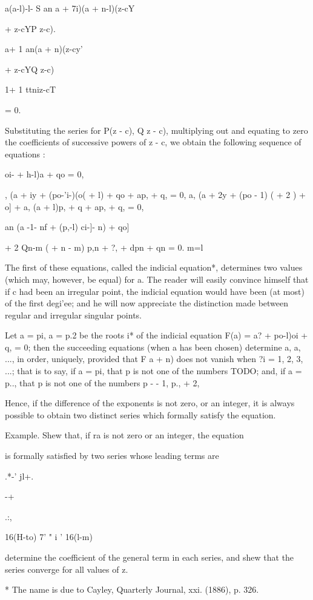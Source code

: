a(a-l)-l- S an a + 7i)(a + n-l)(z-cY

+ z-cYP z-c).

a+ 1 an(a + n)(z-cy'

+ z-cYQ z-c)

1+ 1 ttniz-cT

= 0.

Substituting the series for P(z - c), Q z - c), multiplying out and
equating to zero the coefficients of successive powers of z - c, we
obtain the following sequence of equations :

oi- + h-l)a + qo = 0,

, (a + iy + (po-'i-)(o( + l) + qo + ap, + q, = 0, a, (a + 2y + (po -
1) ( + 2 ) + o] + a, (a + l)p, + q + ap, + q, = 0,

an (a -1- nf + (p,-l) ci-]- n) + qo]

+ 2 Qn-m ( + n - m) p,n + ?, + dpn + qn = 0. m=l

The first of these equations, called the indicial equation*,
determines two values (which may, however, be equal) for a. The reader
will easily convince himself that if c had been an irregular point,
the indicial equation would have been (at most) of the first degi'ee;
and he will now appreciate the distinction made between regular and
irregular singular points.

Let a = pi, a = p.2 be the roots i* of the indicial equation F(a) = a?
+ po-l)oi + q, = 0; then the succeeding equations (when a has been
chosen) determine a, a, ..., in order, uniquely, provided that F a +
n) does not vanish when ?i = 1, 2, 3, ...; that is to say, if a = pi,
that p is not one of the numbers TODO; and, if a =
p.., that p is not one of the numbers p - - 1, p., + 2,

Hence, if the difference of the exponents is not zero, or an integer,
it is always possible to obtain two distinct series which formally
satisfy the equation.

Example. Shew that, if ra is not zero or an integer, the equation

is formally satisfied by two series whose leading terms are

.*-' jl+.

-+

.:,

16(H-to) 7' " i ' 16(l-m)

determine the coefficient of the general term in each series, and shew
that the series converge for all values of z.

* The name is due to Cayley, Quarterly Journal, xxi. (1886), p. 326.

